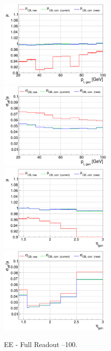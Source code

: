\begin{figure}
\includegraphics[width=0.495\textwidth]{./plots_pdf/ECAL_plots/plotsPU/EE/FULL/pdf/GENPT/EEFULL_GENPT_0020_0100_MuOverBins.pdf}
\includegraphics[width=0.495\textwidth]{./plots_pdf/ECAL_plots/plotsPU/EE/FULL/pdf/GENPT/EEFULL_GENPT_0020_0100_EffSigmaOverBins.pdf}
\includegraphics[width=0.495\textwidth]{./plots_pdf/ECAL_plots/plotsPU/EE/FULL/pdf/GENETA/EEFULL_GENETA_0020_0100_MuOverBins.pdf}
\includegraphics[width=0.495\textwidth]{./plots_pdf/ECAL_plots/plotsPU/EE/FULL/pdf/GENETA/EEFULL_GENETA_0020_0100_EffSigmaOverBins.pdf}
\caption{EE - Full Readout --100\GeV.}
\end{figure}


